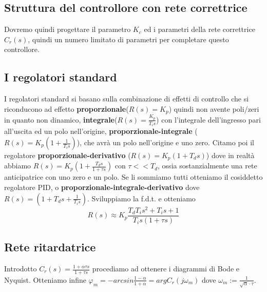 \documentclass[11pt]{article}
\begin{document}
\subsection{Struttura del controllore con rete correttrice}
Dovremo quindi progettare il parametro $K_c$ ed i parametri della rete correttrice $C_r(s)$, quindi un numero limitato di parametri per completare questo controllore. 
\subsection{I regolatori standard}
I regolatori standard si basano sulla combinazione di effetti di controllo che si riconducono ad effetto \textbf{proporzionale}($R(s)=K_p$) quindi non avente poli/zeri in quanto non dinamico, \textbf{integrale}($R(s)=\frac{K_p}{T_is}$) con l'integrale dell'ingresso pari all'uscita ed un polo nell'origine, \textbf{proporzionale-integrale} ($R(s)=K_p\left(1+\frac{1}{T_is}\right)$), che avrà un polo nell'origine e uno zero. Citamo poi il regolatore \textbf{proporzionale-derivativo} ($R(s)=K_p(1+T_ds)$) dove in realtà abbiamo $R(s)=K_p\left(1+\frac{T_ds}{1+\tau s}\right)$ con $\tau<<T_d$, ossia sostanzialmente una rete anticipatrice con uno zero e un polo. Se li sommiamo tutti otteniamo il cosiddetto regolatore PID, o \textbf{proporzionale-integrale-derivativo} dove $R(s)=\left(1+T_ds+\frac{1}{T_is}\right)$. Sviluppiamo la f.d.t. e otteniamo \begin{displaymath}
    R(s)\approx K_p \frac{T_dT_is^2+T_is+1}{T_is(1+\tau s)}
\end{displaymath}
\subsection{Rete ritardatrice}
Introdotto $C_r(s) = \frac{1+\alpha\tau s}{1+\tau s}$ procediamo ad ottenere i diagrammi di Bode e Nyquist. Otteniamo infine $\varphi_m = -arcsin\frac{1-\alpha}{1+\alpha}=argC_r(j\omega_m)$ dove $\omega_m := \frac{1}{\sqrt{\alpha}\cdot \tau}$.
\end{document}
